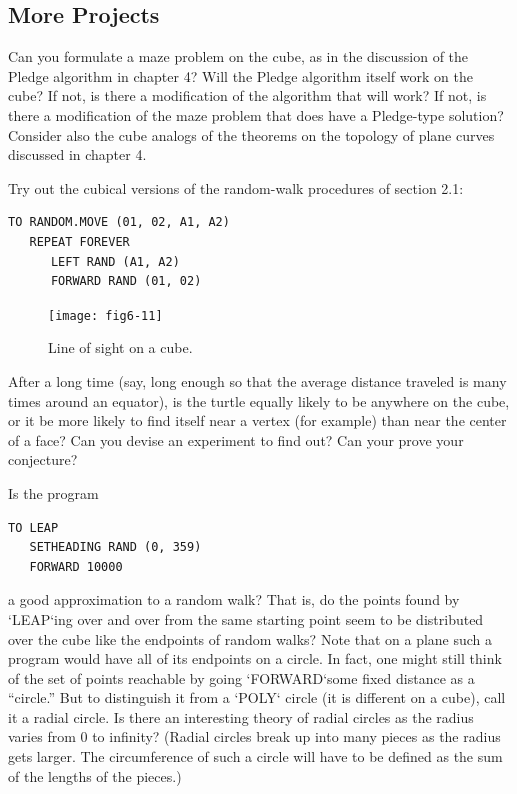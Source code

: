 \documentclass{book}
\begin{document}
\subsection{More Projects}

Can you formulate a maze problem on the cube, as in the discussion of
the Pledge algorithm in chapter 4? Will the Pledge algorithm itself work
on the cube? If not, is there a modification of the algorithm that will
work? If not, is there a modification of the maze problem that does have
a Pledge-type solution? Consider also the cube analogs of the theorems
on the topology of plane curves discussed in chapter 4.

Try out the cubical versions of the random-walk procedures of section
2.1:

\begin{verbatim}
TO RANDOM.MOVE (01, 02, A1, A2)
   REPEAT FOREVER
      LEFT RAND (A1, A2)
      FORWARD RAND (01, 02)
\end{verbatim}
\begin{figure}
\begin{center}
\texttt{[image: fig6-11]}
\caption{Line of sight on a cube.}
\end{center}
\end{figure}

After a long time (say, long enough so that the average distance traveled
is many times around an equator), is the turtle equally likely to be
anywhere on the cube, or it be more likely to find itself near a vertex (for
example) than near the center of a face? Can you devise an experiment
to find out? Can your prove your conjecture?

Is the program

\begin{verbatim}
TO LEAP
   SETHEADING RAND (0, 359)
   FORWARD 10000
\end{verbatim}
a good approximation to a random walk? That is, do the points found
by \textsc{`LEAP`}ing over and over from the same starting point seem to be
distributed over the cube like the endpoints of random walks? Note
that on a plane such a program would have all of its endpoints on a
circle. In fact, one might still think of the set of points reachable by
going \textsc{`FORWARD`}some fixed distance as a ``circle.'' But to distinguish it
from a \textsc{`POLY`} circle (it is different on a cube), call it a radial circle. Is
there an interesting theory of radial circles as the radius varies from 0
to infinity? (Radial circles break up into many pieces as the radius gets
larger. The circumference of such a circle will have to be defined as the
sum of the lengths of the pieces.)
\end{document}
